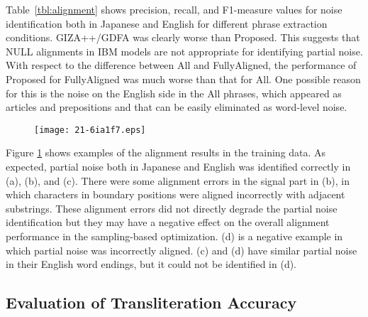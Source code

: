 \documentclass[english]{jnlp_1.4}
\begin{document}
Table~{\ref{tbl:alignment}} shows precision, recall, and F1-measure values for noise identification
both in Japanese and English
for different phrase extraction conditions.
{\sc GIZA++/GDFA} was clearly worse than {\sc Proposed}.
This suggests that NULL alignments in IBM models are not appropriate for identifying partial noise.
With respect to the difference between {\sc All} and {\sc FullyAligned},
the performance of {\sc Proposed} for {\sc FullyAligned} was much worse than that for {\sc All}.
One possible reason for this is the noise on the English side in the {\sc All} phrases,
which appeared as articles and prepositions and that can be easily eliminated as word-level noise.

\begin{table}[b]
\label{tbl:alignment}

\end{table}
\begin{figure}[b]
\begin{center}
\texttt{[image: 21-6ia1f7.eps]}
\end{center}
\label{fig:examples-alignment}
\end{figure}

Figure \ref{fig:examples-alignment} shows examples of the alignment results in the training data.
As expected, partial noise both in Japanese and English was identified correctly in (a), (b), and (c).
There were some alignment errors in the signal part in (b),
in which characters in boundary positions were aligned incorrectly with adjacent substrings.
These alignment errors did not directly degrade the partial noise identification
but they may have a negative effect on the overall alignment performance in the sampling-based optimization.
(d) is a negative example in which partial noise was incorrectly aligned.
(c) and (d) have similar partial noise in their English word endings,
but it could not be identified in (d).


\subsection{Evaluation of Transliteration Accuracy}
\end{document}
